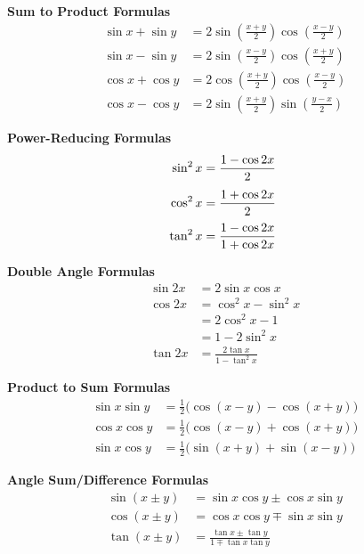 \noindent%
\begin{minipage}[t]{.44\linewidth}
\textbf{Sum to Product Formulas}\vspace{-.5\baselineskip}
\begin{align*}
\sin x+\sin y &= 2\sin (\tfrac{x+y}2)\cos(\tfrac{x-y}2) &~\\
\sin x-\sin y &= 2\sin (\tfrac{x-y}2)\cos(\tfrac{x+y}2) \\
\cos x+\cos y &= 2\cos (\tfrac{x+y}2)\cos(\tfrac{x-y}2) \\
\cos x-\cos y &= 2\sin (\tfrac{x+y}2)\sin(\tfrac{y-x}2)
\end{align*}
\end{minipage}%
\begin{minipage}[t]{.3\linewidth}
\textbf{Power-Reducing Formulas}\vspace{-.5\baselineskip}
\begin{align*}
\sin^2 x &= \frac{1-\cos 2x}{2} & \vphantom{\left(\frac11\right)}&~\\
\cos^2 x &= \frac{1+\cos 2x}{2} & \vphantom{\left(\frac11\right)}\\
\tan^2 x &= \frac{1-\cos 2x}{1+\cos 2x}
\end{align*}
\end{minipage}%
\begin{minipage}[t]{.25\linewidth}
	\textbf{Double Angle Formulas}\vspace{-.5\baselineskip}
	\begin{align*}
		\sin 2x &= 2\sin x\cos x &~\\
		\cos 2x &= \cos^2x - \sin^2 x \\
		&= 2\cos^2x-1 \\
		&= 1-2\sin^2x \\
		\tan 2x &= \frac{2\tan x}{1-\tan^2 x}
	\end{align*}
\end{minipage}

\vfill

\noindent
\begin{minipage}[t]{.45\linewidth}
\textbf{Product to Sum Formulas}\vspace{-.5\baselineskip}
\begin{align*}
\sin x\sin y &= \tfrac12\bigl(\cos(x-y)-\cos(x+y)\bigr) &~\\
\cos x\cos y &= \tfrac12\bigl(\cos(x-y)+\cos(x+y)\bigr) \\
\sin x\cos y &= \tfrac12\bigl(\sin(x+y)+\sin(x-y)\bigr)
\end{align*}
\end{minipage}%
\begin{minipage}[t]{.45\linewidth}
\textbf{Angle Sum/Difference Formulas}\vspace{-.5\baselineskip}
\begin{align*}
\sin (x\pm y) &= \sin x\cos y \pm \cos x\sin y &~\\
\cos (x\pm y) &= \cos x\cos y \mp \sin x\sin y\\
\tan (x\pm y) &= \frac{\tan x\pm \tan y}{1\mp \tan x\tan y}
\end{align*}
\end{minipage}

